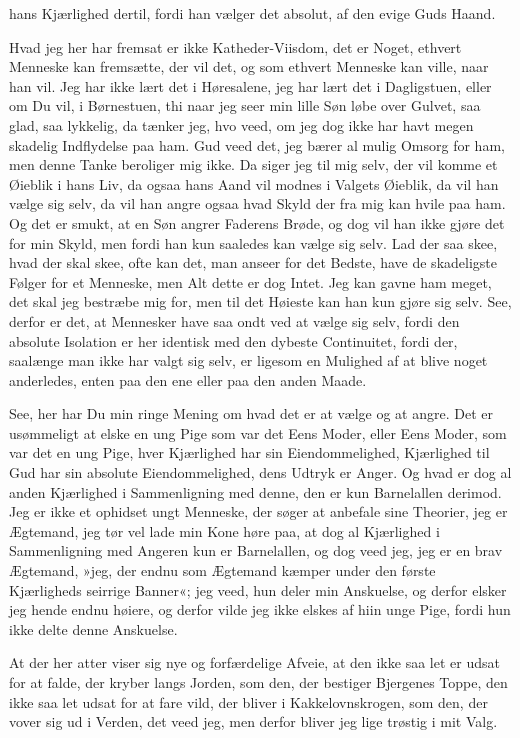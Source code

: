 \documentclass[12pt,a4paper]{article}
\begin{document}
hans Kjærlighed dertil, fordi han vælger det absolut, af den evige Guds Haand.

Hvad jeg her har fremsat er ikke Katheder-Viisdom, det er Noget, ethvert Menneske kan fremsætte, der vil det, og som ethvert Menneske kan ville, naar han vil. Jeg har ikke lært det i Høresalene, jeg har lært det i Dagligstuen, eller om Du vil, i Børnestuen, thi naar jeg seer min lille Søn løbe over Gulvet, saa glad, saa lykkelig, da tænker jeg, hvo veed, om jeg dog ikke har havt megen skadelig Indflydelse paa ham. Gud veed det, jeg bærer al mulig Omsorg for ham, men denne Tanke beroliger mig ikke. Da siger jeg til mig selv, der vil komme et Øieblik i hans Liv, da ogsaa hans Aand vil modnes i Valgets Øieblik, da vil han vælge sig selv, da vil han angre ogsaa hvad Skyld der fra mig kan hvile paa ham. Og det er smukt, at en Søn angrer Faderens Brøde, og dog vil han ikke gjøre det for min Skyld, men fordi han kun saaledes kan vælge sig selv. Lad der saa skee, hvad der skal skee, ofte kan det, man anseer for det Bedste, have de skadeligste Følger for et Menneske, men Alt dette er dog Intet. Jeg kan gavne ham meget, det skal jeg bestræbe mig for, men til det Høieste kan han kun gjøre sig selv. See, derfor er det, at Mennesker have saa ondt ved at vælge sig selv, fordi den absolute Isolation er her identisk med den dybeste Continuitet, fordi der, saalænge man ikke har valgt sig selv, er ligesom en Mulighed af at blive noget anderledes, enten paa den ene eller paa den anden Maade.

See, her har Du min ringe Mening om hvad det er at vælge og at angre. Det er usømmeligt at elske en ung Pige som var det Eens Moder, eller Eens Moder, som var det en ung Pige, hver Kjærlighed har sin Eiendommelighed, Kjærlighed til Gud har sin absolute Eiendommelighed, dens Udtryk er Anger. Og hvad er dog al anden Kjærlighed i Sammenligning med denne, den er kun Barnelallen derimod. Jeg er ikke et ophidset ungt Menneske, der søger at anbefale sine Theorier, jeg er Ægtemand, jeg tør vel lade min Kone høre paa, at dog al Kjærlighed i Sammenligning med Angeren kun er Barnelallen, og dog veed jeg, jeg er en brav Ægtemand, »jeg, der endnu som Ægtemand kæmper under den første Kjærligheds seirrige Banner«; jeg veed, hun deler min Anskuelse, og derfor elsker jeg hende endnu høiere, og derfor vilde jeg ikke elskes af hiin unge Pige, fordi hun ikke delte denne Anskuelse.

At der her atter viser sig nye og forfærdelige Afveie, at den ikke saa let er udsat for at falde, der kryber langs Jorden, som den, der bestiger Bjergenes Toppe, den ikke saa let udsat for at fare vild, der bliver i Kakkelovnskrogen, som den, der vover sig ud i Verden, det veed jeg, men derfor bliver jeg lige trøstig i mit Valg.
\end{document}

